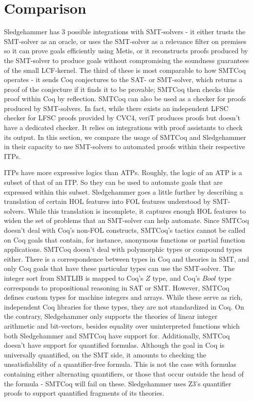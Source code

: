 \documentclass{article}
\begin{document}
\section{Comparison}
\label{sec:comp}
	Sledgehammer has 3 possible integrations with SMT-solvers - 
	it either trusts the SMT-solver as an oracle, or uses the 
	SMT-solver as a relevance filter on premises so it can 
	prove goals efficiently using Metis, or it reconstructs 
	proofs produced by the SMT-solver to produce goals 
	without compromising the soundness guarantees of the 
	small LCF-kernel. The third of these is most comparable 
	to how SMTCoq operates - it sends Coq conjectures to the 
	SAT- or SMT-solver, which returns a proof of the conjecture 
	if it finds it to be provable; SMTCoq then checks this 
	proof within Coq by reflection. SMTCoq can also be used as a 
	checker for proofs produced by SMT-solvers. In fact, while 
	there exists an independent LFSC checker for LFSC proofs 
	provided by CVC4, veriT produces proofs but doesn't 
	have a dedicated checker. It relies on integrations with 
	proof assistants to check its output. In this section, we 
	compare the usage of SMTCoq and Sledgehammer in their 
	capacity to use SMT-solvers to automated proofs within 
	their respective ITPs.
	
	ITPs have more expressive logics than ATPs. Roughly, the 
	logic of an ATP is a subset of that of an ITP. So they 
	can be used to automate goals that are expressed within 
	this subset. Sledgehammer goes a little further by 
	describing a translation of certain HOL features 
	into FOL features understood by SMT-solvers. While this 
	translation is incomplete, it captures enough HOL features 
	to widen the set of problems that an SMT-solver can 
	help automate. Since SMTCoq doesn't deal with
	Coq's non-FOL constructs, SMTCoq's tactics 
	cannot be called on Coq goals that contain, 
	for instance, anonymous functions or partial function 
	applications. SMTCoq doesn't deal with 
	polymorphic types or compound types either. There is a
	correspondence between types in Coq and theories in SMT, 
	and only Coq goals that have these particular types can 
	use the SMT-solver. The integer sort from SMTLIB is 
	mapped to Coq's $Z$ type, and Coq's $Bool$ type 
	corresponds to propositional reasoning in SAT or SMT.
	However, SMTCoq defines custom types 
	for machine integers and arrays. While these serve as 
	rich, independent Coq libraries for these types, 
	they are not standardized in Coq. On the contrary,
	Sledgehammer only supports the theories of linear 
	integer arithmetic and bit-vectors, besides equality 
	over uninterpreted functions which both Sledgehammer 
	and SMTCoq have support for. Additionally, SMTCoq 
	doesn't have support for quantified formulas. Although 
	the goal in Coq is universally quantified, on the SMT 
	side, it amounts to checking the unsatisfiability of a quantifier-free formula. This is not the case with 
	formulas containing either alternating quantifiers, or 
	those that occur outside the head of the formula - 
	SMTCoq will fail on these. Sledgehammer uses Z3's 
	quantifier proofs to support quantified fragments of 
	its theories.
	
\end{document}
